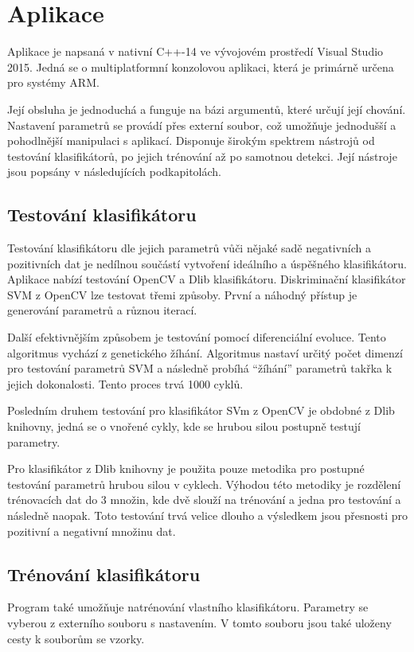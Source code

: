 \section{Aplikace}
Aplikace je napsaná v nativní C++-14 ve vývojovém prostředí Visual Studio 2015. Jedná se o multiplatformní konzolovou aplikaci, která je primárně určena pro systémy ARM. 

Její obsluha je jednoduchá a funguje na bázi argumentů, které určují její chování. Nastavení parametrů se provádí přes externí soubor, což umožňuje jednodušší a pohodlnější manipulaci s aplikací. Disponuje širokým spektrem nástrojů od testování klasifikátorů, po jejich trénování až po samotnou detekci. Její nástroje jsou popsány v následujících podkapitolách.


\subsection{Testování klasifikátoru}
Testování klasifikátoru dle jejich parametrů vůči nějaké sadě negativních a pozitivních dat je nedílnou součástí vytvoření ideálního a úspěšného klasifikátoru.  Aplikace nabízí testování OpenCV a Dlib klasifikátoru. Diskriminační klasifikátor SVM z OpenCV lze testovat třemi způsoby. První a náhodný přístup je generování parametrů a různou iterací.

Další efektivnějším způsobem je testování pomocí diferenciální evoluce. Tento algoritmus vychází z genetického žíhání. Algoritmus nastaví určitý počet dimenzí pro testování parametrů SVM a následně probíhá ``žíhání'' parametrů takřka k jejich dokonalosti. Tento proces trvá 1000 cyklů.

Posledním druhem testování pro klasifikátor SVm z OpenCV je obdobné z Dlib knihovny, jedná se o vnořené cykly, kde se hrubou silou postupně testují parametry. 

Pro klasifikátor z Dlib knihovny je použita pouze metodika pro postupné testování parametrů hrubou silou v cyklech. Výhodou této metodiky je rozdělení trénovacích dat do 3 množin, kde dvě slouží na trénování a jedna pro testování a následně naopak. Toto testování trvá velice dlouho a výsledkem jsou přesnosti pro pozitivní a negativní množinu dat.


\subsection{Trénování klasifikátoru}
Program také umožňuje natrénování vlastního klasifikátoru. Parametry se vyberou z externího souboru s nastavením. V tomto souboru jsou také uloženy cesty k souborům se vzorky. 

